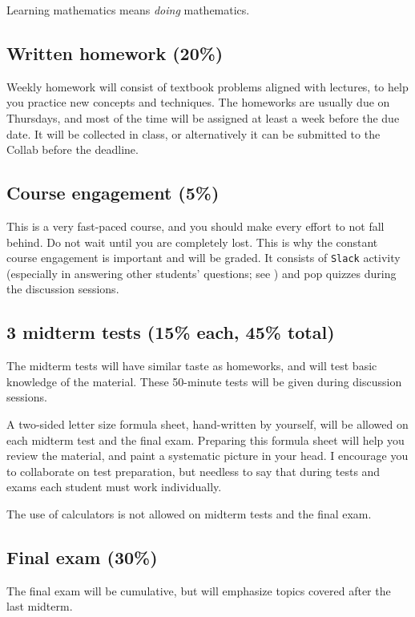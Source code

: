 \documentclass[oneside,11pt]{amsart}
\begin{document}
Learning mathematics means \emph{doing} mathematics. 

\subsection{Written homework (20\%)} Weekly homework will consist of textbook problems aligned with lectures, to help you practice new concepts and techniques. The homeworks are usually due on Thursdays, and most of the time will be assigned at least a week before the due date. It will be collected in class, or alternatively it can be submitted to the Collab before the deadline.

\subsection{Course engagement (5\%)}

This is a very fast-paced course, and you should make every effort to not fall behind. Do not wait until you are completely lost. This is why the constant course engagement is important and will be graded. It consists of \texttt{Slack} activity (especially in answering other students' questions; see ) and pop quizzes during the discussion sessions.

\subsection{3 midterm tests (15\% each, 45\% total)}

The midterm tests will have similar taste as homeworks, and will test basic knowledge of the material. These 50-minute tests will be given during discussion sessions.

A two-sided letter size formula sheet, hand-written by yourself, will be allowed on each midterm test and the final exam. Preparing this formula sheet will help you review the material, and paint a systematic picture in your head. I encourage you to collaborate on test preparation, but needless to say that during tests and exams each student must work individually.

The use of calculators is not allowed on midterm tests and the final exam.

\subsection{Final exam (30\%)}
The final exam will be cumulative, but will emphasize topics covered after the last midterm.
\end{document}
